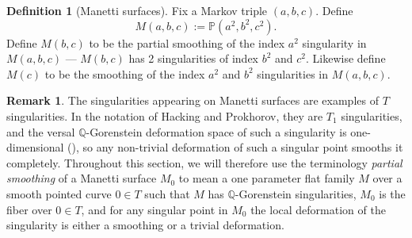 \documentclass[JEP,XML,SOM,Unicode,NoFloatCountersInSection,published]{cedram}
\theoremstyle{plain}
\theoremstyle{definition}
\newtheorem{remark}[theorem]{Remark}
\newtheorem{definition}[theorem]{Definition}
\newcommand\PP{{\mathbb{P}}}
\newcommand\QQ{{\mathbb Q}}
\begin{document}
\begin{definition}[Manetti surfaces]
Fix a Markov triple $(a,b,c)$. Define
\[
M(a,b,c):= \PP(a^2,b^2,c^2).
\]
Define $M(b,c)$ to be the partial smoothing of the index $a^2$ singularity in $M(a,b,c)$ --- \ie $M(b,c)$ has 2 singularities of index $b^2$ and $c^2$. Likewise define $M(c)$ to be the smoothing of the index $a^2$ and $b^2$ singularities in $M(a,b,c)$.
\end{definition}

\begin{remark}
The singularities appearing on Manetti surfaces are examples of $T$ singularities. In the notation of Hacking and Prokhorov, they are $T_1$ singularities, and the versal $\QQ$-Gorenstein deformation space of such a singularity is one-dimensional (\cf \cite[p.\,4]{HackProk}), so any non-trivial deformation of such a singular point smooths it completely. Throughout this section, we will therefore use the terminology \textit{partial smoothing} of a Manetti surface $M_0$ to mean a one parameter flat family $M$ over a smooth pointed curve $0\in T$ such that $M$ has $\QQ$-Gorenstein singularities, $M_0$ is the fiber over $0 \in T$, and for any singular point in $M_0$ the local deformation of the singularity is either a smoothing or a trivial deformation.
\end{remark}
\end{document}
